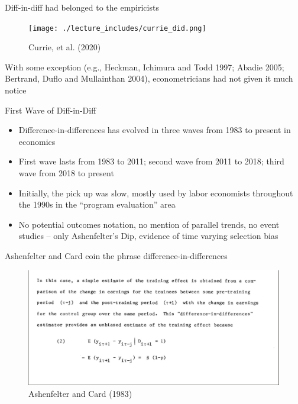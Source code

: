 \documentclass{beamer}
\begin{document}
\begin{frame}{Diff-in-diff had belonged to the empiricists}

	\begin{figure}
	\caption{Currie, et al. (2020)}
	\texttt{[image: ./lecture\_includes/currie\_did.png]}
	\end{figure}

\bigskip

\footnotesize

With some exception (e.g., Heckman, Ichimura and Todd 1997; Abadie 2005; Bertrand, Duflo and Mullainthan 2004), econometricians had not given it much notice

\end{frame}

\begin{frame}{First Wave of Diff-in-Diff}

\begin{itemize}
\item Difference-in-differences has evolved in three waves from 1983 to present in economics
\item First wave lasts from 1983 to 2011; second wave from 2011 to 2018; third wave from 2018 to present
\item Initially, the pick up was slow, mostly used by labor economists throughout the 1990s in the ``program evaluation'' area
\item No potential outcomes notation, no mention of parallel trends, no event studies -- only Ashenfelter's Dip, evidence of time varying selection bias

\end{itemize}

\end{frame}


\begin{frame}{Ashenfelter and Card coin the phrase difference-in-differences}

	\begin{figure}
	\caption{Ashenfelter and Card (1983)}
	\includegraphics[scale=0.2]{./lecture_includes/orley1983.png}
	\end{figure}


\end{frame}
\end{document}
